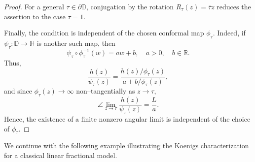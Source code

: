 \documentclass[10pt,a4paper]{amsart}
\numberwithin{equation}{section}
\begin{document}
\begin{proof}
For a general $\tau\in\partial\mathbb{D}$, conjugation by the rotation
$R_\tau(z)=\overline{\tau}z$ reduces the assertion to the case
$\tau=1$.

Finally, the condition is independent of the chosen conformal map
$\phi_\tau$. Indeed, if $\psi_\tau:\mathbb{D}\to\mathbb{H}$ is another
such map, then
\begin{equation*}
\psi_\tau\circ\phi_\tau^{-1}(w)=aw+b,
\quad a>0,\quad b\in\mathbb{R}.
\end{equation*}
Thus,
\begin{equation*}
\frac{h(z)}{\psi_\tau(z)}
=
\frac{h(z)/\phi_\tau(z)}
     {a+b/\phi_\tau(z)},
\end{equation*}
and since $\phi_\tau(z)\to\infty$ non--tangentially as
$z\to\tau$,
\begin{equation*}
\angle\lim_{z\to\tau}
\frac{h(z)}{\psi_\tau(z)}
=
\frac{L}{a}.
\end{equation*}
Hence, the existence of a finite nonzero angular limit is independent
of the choice of $\phi_\tau$.
\end{proof}

We continue with the following example illustrating the Koenigs
characterization for a classical linear fractional model.
\end{document}
